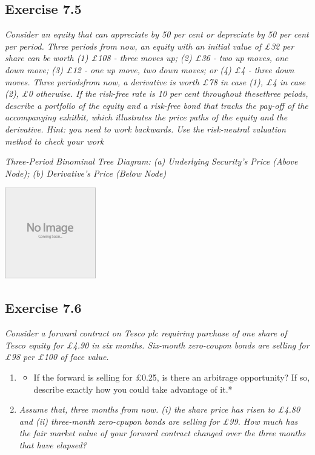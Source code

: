 \documentclass[]{book}
\providecommand{\tightlist}{%
  \setlength{\itemsep}{0pt}\setlength{\parskip}{0pt}}
\theoremstyle{definition}
\theoremstyle{definition}
\theoremstyle{remark}
\begin{document}
\subsection{Exercise 7.5}\label{exercise-7.5}

\emph{Consider an equity that can appreciate by 50 per cent or
depreciate by 50 per cent per period. Three periods from now, an equity
with an initial value of £32 per share can be worth (1) £108 - three
moves up; (2) £36 - two up moves, one down move; (3) £12 - one up move,
two down moves; or (4) £4 - three down moves. Three periodsfrom now, a
derivative is worth £78 in case (1), £4 in case (2), £0 otherwise. If
the risk-free rate is 10 per cent throughout thesethree peiods, describe
a portfolio of the equity and a risk-free bond that tracks the pay-off
of the accompanying exhitbit, which illustrates the price paths of the
equity and the derivative. Hint: you need to work backwards. Use the
risk-neutral valuation method to check your work} \citep[p.235]{book}

\emph{Three-Period Binominal Tree Diagram: (a) Underlying Security's
Price (Above Node); (b) Derivative's Price (Below Node)}
\citep[p.235]{book}

\begin{center}\includegraphics[width=150px]{figures/placeholder} \end{center}

\subsection{Exercise 7.6}\label{exercise-7.6}

\emph{Consider a forward contract on Tesco plc requiring purchase of one
share of Tesco equity for £4.90 in six months. Six-month zero-coupon
bonds are selling for £98 per £100 of face value.} \citep[p.235]{book}

\begin{enumerate}
\def\labelenumi{\alph{enumi}.}
\item
  \begin{itemize}
  \tightlist
  \item
    If the forward is selling for £0.25, is there an arbitrage
    opportunity? If so, describe exactly how you could take advantage of
    it.* \citep[p.236]{book}
  \end{itemize}
\item
  \emph{Assume that, three months from now. (i) the share price has
  risen to £4.80 and (ii) three-month zero-cpupon bonds are selling for
  £99. How much has the fair market value of your forward contract
  changed over the three months that have elapsed?} \citep[p.236]{book}
\end{enumerate}
\end{document}
